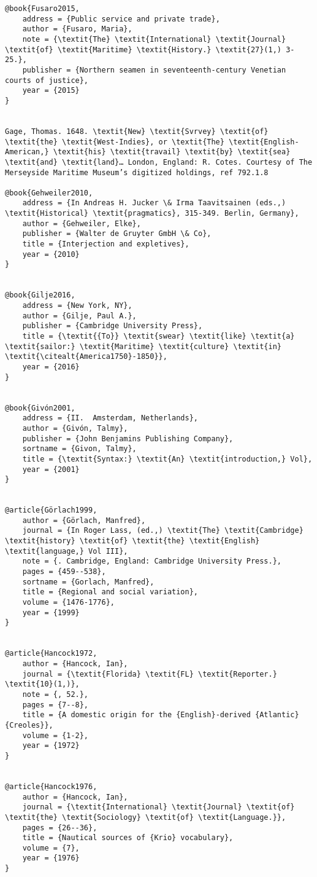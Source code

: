 \begin{verbatim}
@book{Fusaro2015,
	address = {Public service and private trade},
	author = {Fusaro, Maria},
	note = {\textit{The} \textit{International} \textit{Journal} \textit{of} \textit{Maritime} \textit{History.} \textit{27}(1,) 3-25.},
	publisher = {Northern seamen in seventeenth-century Venetian courts of justice},
	year = {2015}
}


Gage, Thomas. 1648. \textit{New} \textit{Svrvey} \textit{of} \textit{the} \textit{West-Indies}, or \textit{The} \textit{English-American,} \textit{his} \textit{travail} \textit{by} \textit{sea} \textit{and} \textit{land}… London, England: R. Cotes. Courtesy of The Merseyside Maritime Museum’s digitized holdings, ref 792.1.8

@book{Gehweiler2010,
	address = {In Andreas H. Jucker \& Irma Taavitsainen (eds.,) \textit{Historical} \textit{pragmatics}, 315-349. Berlin, Germany},
	author = {Gehweiler, Elke},
	publisher = {Walter de Gruyter GmbH \& Co},
	title = {Interjection and expletives},
	year = {2010}
}


@book{Gilje2016,
	address = {New York, NY},
	author = {Gilje, Paul A.},
	publisher = {Cambridge University Press},
	title = {\textit{{To}} \textit{swear} \textit{like} \textit{a} \textit{sailor:} \textit{Maritime} \textit{culture} \textit{in} \textit{\citealt{America1750}-1850}},
	year = {2016}
}


@book{Givón2001,
	address = {II.  Amsterdam, Netherlands},
	author = {Givón, Talmy},
	publisher = {John Benjamins Publishing Company},
	sortname = {Givon, Talmy},
	title = {\textit{Syntax:} \textit{An} \textit{introduction,} Vol},
	year = {2001}
}


@article{Görlach1999,
	author = {Görlach, Manfred},
	journal = {In Roger Lass, (ed.,) \textit{The} \textit{Cambridge} \textit{history} \textit{of} \textit{the} \textit{English} \textit{language,} Vol III},
	note = {. Cambridge, England: Cambridge University Press.},
	pages = {459--538},
	sortname = {Gorlach, Manfred},
	title = {Regional and social variation},
	volume = {1476-1776},
	year = {1999}
}


@article{Hancock1972,
	author = {Hancock, Ian},
	journal = {\textit{Florida} \textit{FL} \textit{Reporter.} \textit{10}(1,)},
	note = {, 52.},
	pages = {7--8},
	title = {A domestic origin for the {English}-derived {Atlantic} {Creoles}},
	volume = {1-2},
	year = {1972}
}


@article{Hancock1976,
	author = {Hancock, Ian},
	journal = {\textit{International} \textit{Journal} \textit{of} \textit{the} \textit{Sociology} \textit{of} \textit{Language.}},
	pages = {26--36},
	title = {Nautical sources of {Krio} vocabulary},
	volume = {7},
	year = {1976}
}



\end{verbatim}
